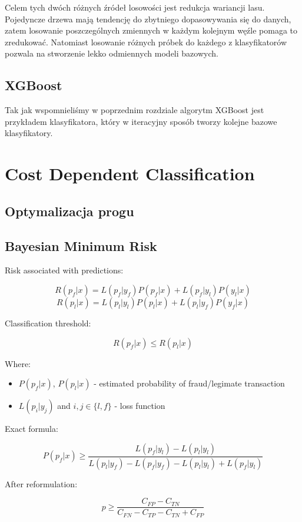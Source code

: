 \documentclass{book}
\begin{document}
	Celem tych dwóch różnych źródeł losowości jest redukcja wariancji lasu. Pojedyncze drzewa mają tendencję do zbytniego dopasowywania się do danych, zatem losowanie poszczególnych zmiennych w każdym kolejnym węźle pomaga to zredukować. Natomiast losowanie różnych próbek do każdego z klasyfikatorów pozwala na stworzenie lekko odmiennych modeli bazowych.

\subsection{XGBoost}
	Tak jak wspomnieliśmy w poprzednim rozdziale algorytm XGBoost jest przykładem klasyfikatora, który w iteracyjny sposób tworzy kolejne bazowe klasyfikatory.
	

\section{Cost Dependent Classification}
	
	\subsection{Optymalizacja progu}
	
	
	
	\subsection{Bayesian Minimum Risk}
	
	Risk associated with predictions:
	
	$$ R(p_f|x) = L(p_f|y_f)P(p_f|x) + L(p_f|y_l)P(y_l|x) $$
	$$ R(p_l|x) = L(p_l|y_l)P(p_l|x) + L(p_l|y_f)P(y_f|x) $$
	
	Classification threshold:
	
	$$ R(p_f|x) \leq R(p_l|x)$$
	
	Where:
	
	\begin{itemize}
		\item $P(p_f|x)$, $P(p_l|x)$ - estimated probability of fraud/legimate transaction
		\item $L(p_{i}|y_{j})$ and $i,j \in \{l,f\}$ - loss function
	\end{itemize}{}
	Exact formula:
	
	$$ P(p_f|x) \ge \frac{L(p_f|y_l) - L(p_l|y_l)}{L(p_l|y_f) - L(p_f|y_f) - L(p_l|y_l) + L(p_f|y_l)}$$
	
	After reformulation:
	
	$$ p \ge \frac{C_{FP} - C_{TN}}{C_{FN} - C_{TP} - C_{TN} + C_{FP}}$$
\end{document}
